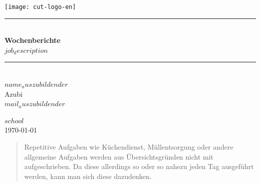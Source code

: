 \documentclass[11pt,a4paper]{article}
\newcommand{\HRule}{\rule{\linewidth}{0.5mm}}
\begin{document}
\begin{titlepage}
\begin{center}
  \texttt{[image: cut-logo-en]}~\\[2cm]


  \HRule \\[0.4cm]
  { \LARGE 
    \textbf{Wochenberichte}\\[0.4cm]
    \emph{$job_description$}\\[0.4cm]
  }
  \HRule \\[1.5cm]



  { \large
    $name_auszubildender$ \\[0.1cm]
    Azubi\\[0.1cm]
    \texttt{$mail_auszubildender$}
  }

  \vfill

  \textsc{\large $school$}\\[0.4cm]


  {\large \today}
  
  \end{center}
  \end{titlepage}

  \newpage

  \begin{abstract}
  
    Repetitive Aufgaben wie Küchendienst, Müllentsorgung oder andere allgemeine Aufgaben werden aus Übersichtsgründen nicht mit aufgeschrieben. Da diese allerdings so oder so nahezu jeden Tag ausgeführt werden, kann man sich diese dazudenken.

  \end{abstract}

  \newpage



  \tableofcontents
  \newpage
  \setcounter{page}{1}


  


  \newpage
\end{document}
